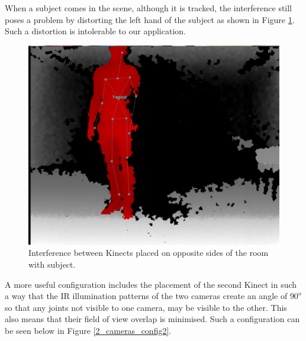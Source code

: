 \documentclass[10pt,a4paper]{article}
\begin{document}
\noindent
When a subject comes in the scene, although it is tracked, the interference still poses a problem by distorting the left hand of the subject as shown in Figure \ref{IR_interference_w_subject}. Such a distortion is intolerable to our application. 

\begin{figure}[H]
\centering
\includegraphics[scale=0.2]{IR_Interference3.jpg}
\caption{Interference between Kinects placed on opposite sides of the room with subject.}
\label{IR_interference_w_subject}
\end{figure}

\noindent
A more useful configuration includes the placement of the second Kinect in such a way that the IR illumination patterns of the two cameras create an angle of $90^o$ so that any joints not visible to one camera, may be visible to the other. This also means that their field of view overlap is minimised. Such a configuration can be seen below in Figure \ref{2_cameras_config2}.
\end{document}
